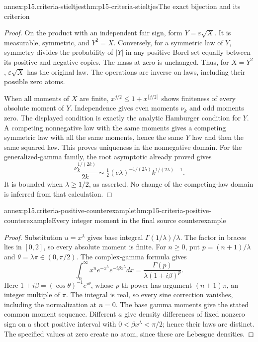 \begin{annexitem}{annex:p15.criteria-stieltjes}{thm:p15-criteria-stieltjes}{The exact bijection and its criterion}
\begin{proof}
On the product with an independent fair sign,
form \(Y=\varepsilon\sqrt X\).
It is measurable, symmetric, and \(Y^2=X\).
Conversely, for a symmetric law of \(Y\),
symmetry divides the probability of \(|Y|\)
in any positive Borel set equally between its
positive and negative copies. The mass at
zero is unchanged. Thus, for \(X=Y^2\),
\(\varepsilon\sqrt X\) has the original law.
The operations are inverse on laws, including
their possible zero atoms.

When all moments of \(X\) are finite,
\(x^{j/2}\leq1+x^{\lceil j/2\rceil}\)
shows finiteness of every absolute moment
of \(Y\). Independence gives even moments
\(\nu_k\) and odd moments zero.
The displayed condition is exactly the
analytic Hamburger condition for \(Y\).
A competing nonnegative law with the same
moments gives a competing symmetric law
with all the same moments, hence the same
\(Y\) law and then the same squared law.
This proves uniqueness in the nonnegative domain.
For the generalized-gamma family, the
root asymptotic already proved gives
\[
 \frac{\nu_k^{1/(2k)}}{2k}
 \sim\tfrac12(e\lambda)^{-1/(2\lambda)}
                                  k^{1/(2\lambda)-1}.
\]
It is bounded when \(\lambda\geq1/2\),
as asserted. No change of the competing-law
domain is inferred from that calculation.
\end{proof}
\end{annexitem}

\begin{annexitem}{annex:p15.criteria-positive-counterexample}{thm:p15-criteria-positive-counterexample}{Every integer moment in the final source counterexample}
\begin{proof}
Substitution \(u=x^\lambda\) gives base integral
\(\Gamma(1/\lambda)/\lambda\).
The factor in braces lies in \([0,2]\),
so every absolute moment is finite.
For \(n\geq0\), put \(p=(n+1)/\lambda\)
and \(\theta=\lambda\pi\in(0,\pi/2)\).
The complex-gamma formula gives
\[
 \int_0^\infty x^n e^{-x^\lambda}e^{-i\beta x^\lambda}dx
                =\frac{\Gamma(p)}{\lambda(1+i\beta)^p}.
\]
Here \(1+i\beta=(\cos\theta)^{-1}e^{i\theta}\),
whose \(p\)-th power has argument
\((n+1)\pi\), an integer multiple of \(\pi\).
The integral is real, so every sine correction
vanishes, including the normalization at \(n=0\).
The base gamma moments give the stated
common moment sequence.
Different \(a\) give density differences of
fixed nonzero sign on a short positive
interval with \(0<\beta x^\lambda<\pi/2\);
hence their laws are distinct.
The specified values at zero create no
atom, since these are Lebesgue densities.
\end{proof}
\end{annexitem}
